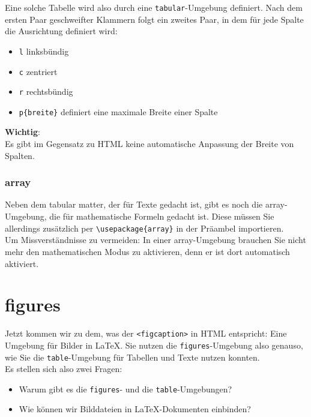 Eine solche Tabelle wird also durch eine \verb|tabular|-Umgebung definiert. Nach dem ersten Paar geschweifter Klammern folgt ein zweites Paar, in dem für jede Spalte die Ausrichtung definiert wird:

\begin{itemize}
	\item \verb|l| linksbündig
	\item \verb|c| zentriert
	\item \verb|r| rechtsbündig
	\item \verb|p{breite}| definiert eine maximale Breite einer Spalte
\end{itemize}

\textbf{Wichtig}:\\

Es gibt im Gegensatz zu HTML keine automatische Anpassung der Breite von Spalten.

\subsubsection{array}

Neben dem tabular matter, der für Texte gedacht ist, gibt es noch die array-Umgebung, die für mathematische Formeln gedacht ist. Diese müssen Sie allerdings zusätzlich per \verb|\usepackage{array}| in der Präambel importieren.\\

Um Missverständnisse zu vermeiden: In einer array-Umgebung brauchen Sie nicht mehr den mathematischen Modus zu aktivieren, denn er ist dort automatisch aktiviert.

\section{figures}

Jetzt kommen wir zu dem, was der \verb|<figcaption>| in HTML entspricht: Eine Umgebung für Bilder in LaTeX. Sie nutzen die \verb|figures|-Umgebung also genauso, wie Sie die \verb|table|-Umgebung für Tabellen und Texte nutzen konnten.\\

Es stellen sich also zwei Fragen:

\begin{itemize}
	\item Warum gibt es die \verb|figures|- und die \verb|table|-Umgebungen?
	\item Wie können wir Bilddateien in LaTeX-Dokumenten einbinden?
\end{itemize}

